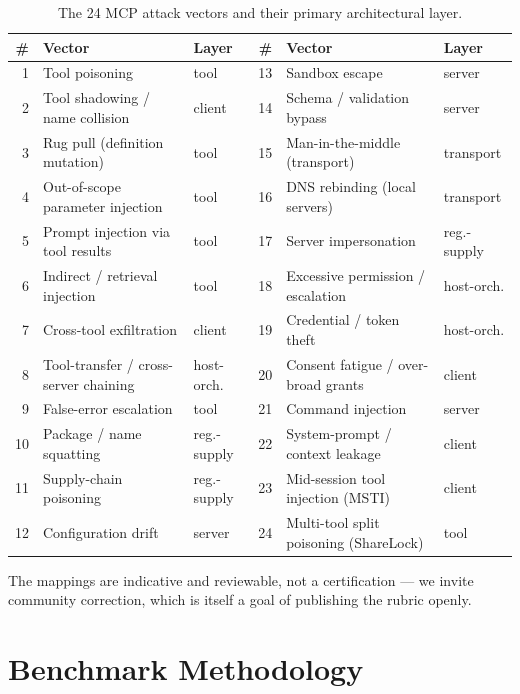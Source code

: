 \documentclass[11pt]{article}
\begin{document}
\begin{table}[t]
\centering
\caption{The 24 MCP attack vectors and their primary architectural layer.}
\label{tab:vectors}
\small
\begin{tabularx}{\linewidth}{@{}r>{\raggedright\arraybackslash}Xl@{\hspace{2em}}r>{\raggedright\arraybackslash}Xl@{}}
\toprule
\# & Vector & Layer & \# & Vector & Layer \\
\midrule
1 & Tool poisoning & tool & 13 & Sandbox escape & server \\
2 & Tool shadowing / name collision & client & 14 & Schema / validation bypass & server \\
3 & Rug pull (definition mutation) & tool & 15 & Man-in-the-middle (transport) & transport \\
4 & Out-of-scope parameter injection & tool & 16 & DNS rebinding (local servers) & transport \\
5 & Prompt injection via tool results & tool & 17 & Server impersonation & reg.-supply \\
6 & Indirect / retrieval injection & tool & 18 & Excessive permission / escalation & host-orch. \\
7 & Cross-tool exfiltration & client & 19 & Credential / token theft & host-orch. \\
8 & Tool-transfer / cross-server chaining & host-orch. & 20 & Consent fatigue / over-broad grants & client \\
9 & False-error escalation & tool & 21 & Command injection & server \\
10 & Package / name squatting & reg.-supply & 22 & System-prompt / context leakage & client \\
11 & Supply-chain poisoning & reg.-supply & 23 & Mid-session tool injection (MSTI) & client \\
12 & Configuration drift & server & 24 & Multi-tool split poisoning (ShareLock) & tool \\
\bottomrule
\end{tabularx}
\end{table}

The mappings are indicative and reviewable, not a certification --- we invite community correction, which is itself a goal of publishing the rubric openly.

\section{Benchmark Methodology}
\label{sec:method}
\end{document}
